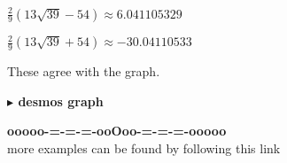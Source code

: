 \documentclass{ximera}
\begin{document}
$\frac{2}{9} (13 \sqrt{39} - 54) \approx 6.041105329$


$\frac{2}{9} (13 \sqrt{39} + 54) \approx -30.04110533$


These agree with the graph.






\textbf{\textcolor{blue!55!black}{$\blacktriangleright$ desmos graph}} 
\begin{center}
\end{center}















\begin{center}
\textbf{\textcolor{green!50!black}{ooooo-=-=-=-ooOoo-=-=-=-ooooo}} \\

more examples can be found by following this link\\ 

\end{center}
\end{document}

